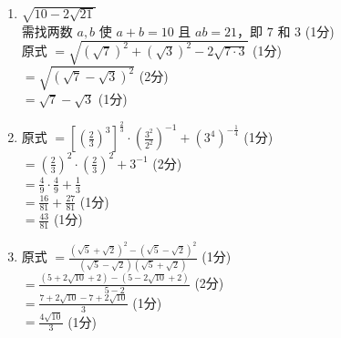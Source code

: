 \documentclass[12pt,a4paper]{exam-zh}
\begin{document}
\begin{solution}
    \begin{enumerate}[label=(\alph*)]
        \item $\sqrt{10 - 2\sqrt{21}}$ \\
        需找两数 $a, b$ 使 $a+b=10$ 且 $ab=21$，即 $7$ 和 $3$ \hfill (1分) \\
        原式 $= \sqrt{(\sqrt{7})^2 + (\sqrt{3})^2 - 2\sqrt{7 \cdot 3}}$ \hfill (1分) \\
        $= \sqrt{(\sqrt{7} - \sqrt{3})^2}$ \hfill (2分) \\
        $= \sqrt{7} - \sqrt{3}$ \hfill (1分)

        \item 原式 $= \left[ \left( \frac{2}{3} \right)^3 \right]^{\frac{2}{3}} \cdot \left( \frac{3^2}{2^2} \right)^{-1} + (3^4)^{-\frac{1}{4}}$ \hfill (1分) \\
        $= \left( \frac{2}{3} \right)^2 \cdot \left( \frac{2}{3} \right)^2 + 3^{-1}$ \hfill (2分) \\
        $= \frac{4}{9} \cdot \frac{4}{9} + \frac{1}{3}$ \\
        $= \frac{16}{81} + \frac{27}{81}$ \hfill (1分) \\
        $= \frac{43}{81}$ \hfill (1分)

        \item 原式 $= \frac{(\sqrt{5} + \sqrt{2})^2 - (\sqrt{5} - \sqrt{2})^2}{(\sqrt{5} - \sqrt{2})(\sqrt{5} + \sqrt{2})}$ \hfill (1分) \\
        $= \frac{(5 + 2\sqrt{10} + 2) - (5 - 2\sqrt{10} + 2)}{5 - 2}$ \hfill (2分) \\
        $= \frac{7 + 2\sqrt{10} - 7 + 2\sqrt{10}}{3}$ \hfill (1分) \\
        $= \frac{4\sqrt{10}}{3}$ \hfill (1分)
    \end{enumerate}
\end{solution}
\end{document}
